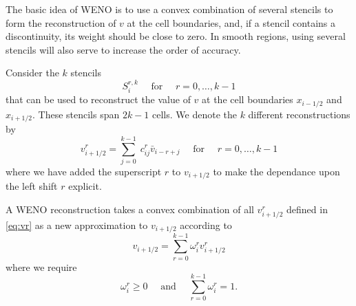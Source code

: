 \documentclass{article}
\newcommand{\for}[0]{\quad \text{ for } \quad}
\newcommand{\xli}[0]{x_{i-1/2}}
\newcommand{\xri}[0]{x_{i+1/2}}
\newcommand{\vri}[0]{v_{i+1/2}}
\numberwithin{equation}{section}
\begin{document}
The basic idea of WENO is to use a convex combination of several
stencils to form the reconstruction of $v$ at the cell boundaries,
and, if a stencil contains a discontinuity, its weight should be close
to zero.  In smooth regions, using several stencils will also serve to
increase the order of accuracy.

Consider the $k$ stencils
\begin{equation*}
  S_i^{r,k} \for r=0,\ldots,k-1
\end{equation*}
that can be used to reconstruct the value of $v$ at the cell
boundaries $\xli$ and $\xri$.  These stencils span $2k-1$ cells.  We
denote the $k$ different reconstructions by
\begin{equation}
  \label{eq:vr}
  \vri^r = \sum_{j=0}^{k-1}\; c_{ij}^r \bar{v}_{i-r+j} \for r=0,\dots,k-1
\end{equation}
where we have added the superscript $r$ to $\vri$ to make the
dependance upon the left shift $r$ explicit.

A WENO reconstruction takes a convex combination of all $\vri^r$
defined in \eqref{eq:vr} as a new approximation to $\vri$ according to
\begin{equation}
  \label{eq:vweno}
  \vri = \sum_{r=0}^{k-1} \omega_i^r \vri^r
\end{equation}
where we require
\begin{equation}
  \omega_i^r \geq 0 \quad \text{ and } \quad \sum_{r=0}^{k-1} \omega_i^r = 1.
\end{equation}
\end{document}
